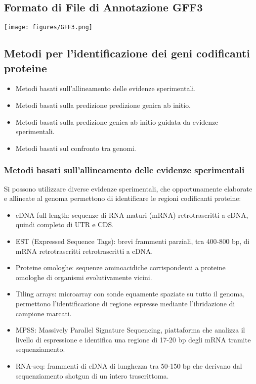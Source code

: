 \documentclass{article}
\begin{document}
\subsection{Formato di File di Annotazione GFF3}
\begin{center}
    \texttt{[image: figures/GFF3.png]}
\end{center}
\subsection{Metodi per l'identificazione dei geni codificanti proteine}
\begin{itemize}
    \item Metodi basati sull’allineamento delle evidenze sperimentali.
    \item Metodi basati sulla predizione predizione genica ab
    initio.
    \item Metodi basati sulla predizione genica ab
    initio guidata da evidenze sperimentali.
    \item Metodi basati sul confronto tra genomi.
\end{itemize}

\subsubsection{Metodi basati sull’allineamento delle evidenze sperimentali}
Si possono utilizzare diverse evidenze sperimentali, che
opportunamente elaborate e allineate al genoma
permettono di identificare le regioni codificanti proteine:
\begin{itemize}
    \item cDNA full-length: sequenze di RNA maturi (mRNA)
    retrotrascritti a cDNA, quindi completo di UTR e CDS.
    \item EST (Expressed Sequence Tags): brevi frammenti parziali, tra
    400-800 bp, di mRNA retrotrascritti retrotrascritti a cDNA. 
    \item Proteine omologhe: sequenze aminoacidiche corrispondenti a
    proteine omologhe di organismi evolutivamente vicini.
    \item Tiling arrays: microarray con sonde equamente spaziate su
    tutto il genoma, permettono l’identificazione di regione
    espresse mediante l’ibridazione di campione marcati.
    \item MPSS: Massively Parallel Signature Sequencing, piattaforma
    che analizza il livello di espressione e identifica una regione di
    17-20 bp degli mRNA tramite sequenziamento.
    \item RNA-seq: frammenti di cDNA di lunghezza tra 50-150 bp che
    derivano dal sequenziamento shotgun di un intero trascrittoma.
\end{itemize}
\end{document}

